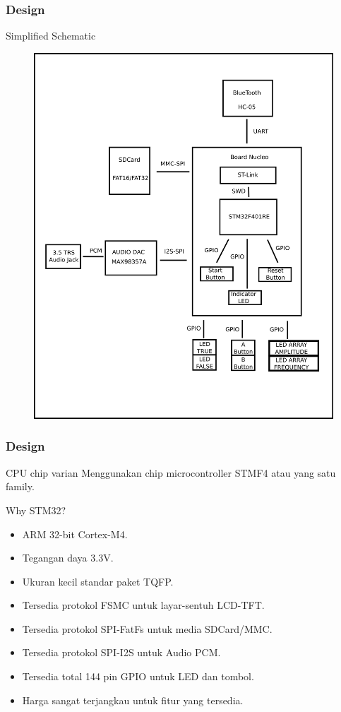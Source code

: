 \documentclass[table,dvipsnames,10pt]{beamer}
\begin{document}
	\begin{frame}
	\frametitle{Design}
	\begin{exampleblock}{Simplified Schematic}
		\begin{figure}[H]
			\centering
			\includegraphics[width=0.55\linewidth]{images/overview}
		\end{figure}
	\end{exampleblock}	
	\end{frame}

	\begin{frame}
	\frametitle{Design}
	\begin{exampleblock}{CPU chip varian}
		Menggunakan chip microcontroller STMF4 atau yang satu family.
	\end{exampleblock}
	\begin{exampleblock}{Why STM32?}
		\begin{itemize}
			\item ARM 32-bit Cortex-M4.
			\item Tegangan daya 3.3V.
			\item Ukuran kecil standar paket TQFP.
			\item Tersedia protokol FSMC untuk layar-sentuh LCD-TFT.
			\item Tersedia protokol SPI-FatFs untuk media SDCard/MMC.
			\item Tersedia protokol SPI-I2S untuk Audio PCM.
			\item Tersedia total 144 pin GPIO untuk LED dan tombol.
			\item Harga sangat terjangkau untuk fitur yang tersedia.
		\end{itemize}
	\end{exampleblock}	
	\end{frame}
	
\end{document}
